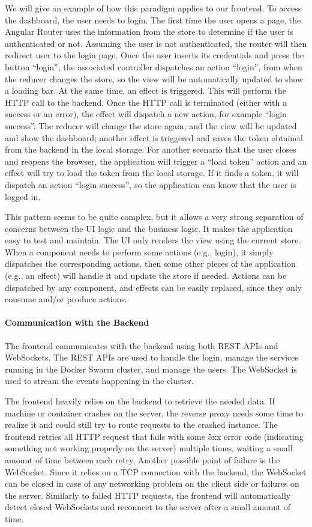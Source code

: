We will give an example of how this paradigm applies to our frontend.
To access the dashboard, the user needs to login.
The first time the user opens a page, the Angular Router uses the information from the store to determine if the user is authenticated or not.
Assuming the user is not authenticated, the router will then redirect user to the login page.
Once the user inserts its credentials and press the button ``login'', the associated controller dispatches an action ``login'', from when the reducer changes the store, so the view will be automatically updated to show a loading bar.
At the same time, an effect is triggered. This will perform the HTTP call to the backend.
Once the HTTP call is terminated (either with a success or an error), the effect will dispatch a new action, for example ``login success''.
The reducer will change the store again, and the view will be updated and show the dashboard;
another effect is triggered and saves the token obtained from the backend in the local storage.
For another scenario that the user closes and reopens the browser,
the application will trigger a ``load token'' action and an effect will try to load the token from the local storage.
If it finds a token, it will dispatch an action ``login success'', so the application can know that the user is logged in.

This pattern seems to be quite complex, but it allows a very strong separation of concerns between the UI logic and the business logic.
It makes the application easy to test and maintain.
The UI only renders the view using the current store. When a component needs to perform some actions (e.g., login), it simply dispatches the corresponding actions, then some other pieces of the application (e.g., an effect) will handle it and update the store if needed.
Actions can be dispatched by any component, and effects can be easily replaced, since they only consume and/or produce actions.

\paragraph{Communication with the Backend}
The frontend communicates with the backend using both REST APIs and WebSockets.
The REST APIs are used to handle the login, manage the services running in the Docker Swarm cluster, and manage the users.
The WebSocket is used to stream the events happening in the cluster.

The frontend heavily relies on the backend to retrieve the needed data.
If machine or container crashes on the server, the reverse proxy needs some time to realize it and could still try to route requests to the crashed instance.
The frontend retries all HTTP request that fails with some 5xx error code (indicating something not working properly on the server) multiple times, waiting a small amount of time between each retry.
Another possible point of failure is the WebSocket.
Since it relies on a TCP connection with the backend, the WebSocket can be closed in case of any networking problem on the client side or failures on the server.
Similarly to failed HTTP requests, the frontend will automatically detect closed WebSockets and reconnect to the server after a small amount of time.

